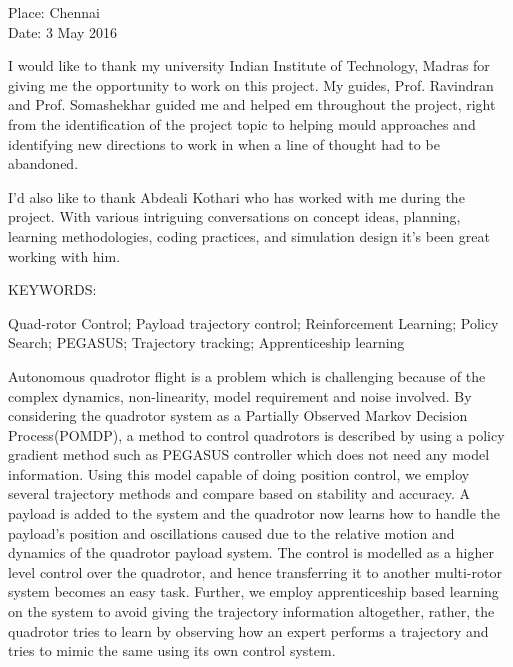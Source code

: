 \documentclass[hidelinks,BTech]{iitmdiss}
\begin{document}
\vspace*{0.25in}
\noindent Place: Chennai\\
Date: 3 May 2016


\acknowledgements

I would like to thank my university Indian Institute of Technology, Madras for giving me the opportunity to work on this project. My guides, Prof. Ravindran and Prof. Somashekhar guided me and helped em throughout the project, right from the identification of the project topic to helping mould approaches and identifying new directions to work in when a line of thought had to be abandoned.

I'd also like to thank Abdeali Kothari who has worked with me during the project. With various intriguing conversations on concept ideas, planning, learning methodologies, coding practices, and simulation design it's been great working with him. 


\abstract

\noindent KEYWORDS: \hspace*{0.5em} \parbox[t]{4.4in}{Quad-rotor Control; Payload  trajectory control; Reinforcement Learning; Policy Search; PEGASUS; Trajectory tracking; Apprenticeship learning }

\vspace*{24pt}

\noindent Autonomous quadrotor flight is a problem which is challenging because of the complex dynamics, non-linearity, model requirement and noise involved. By considering the quadrotor system as a Partially Observed Markov Decision Process(POMDP), a method to control quadrotors is described by using a policy gradient method such as PEGASUS controller which does not need any model information. Using this model capable of doing position control, we employ several trajectory methods and compare based on stability and accuracy. A payload is added to the system and the quadrotor now learns how to handle the payload's position and oscillations caused due to the relative motion and dynamics of the quadrotor payload system. The control is modelled as a higher level control over the quadrotor, and hence transferring it to another multi-rotor system becomes an easy task. Further, we employ apprenticeship based learning on the system to avoid giving the trajectory information altogether, rather, the quadrotor tries to learn by observing how an expert performs a trajectory and tries to mimic the same using its own control system.
\end{document}
